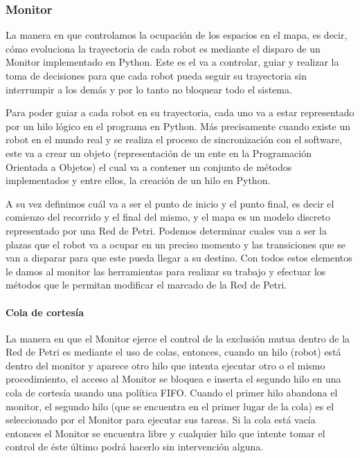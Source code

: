 \subsubsection{Monitor} \mbox{} \vspace{1pt}

La manera en que controlamos la ocupación de los espacios en el mapa, es decir, cómo evoluciona la trayectoria de cada robot es mediante el disparo de un Monitor implementado en Python. Este es el va a controlar, guiar y realizar la toma de decisiones para que cada robot pueda seguir su trayectoria sin interrumpir a los demás y por lo tanto no bloquear todo el sistema.

Para poder guiar a cada robot en su trayectoria, cada uno va a estar representado por un hilo lógico en el programa en Python. Más precisamente cuando existe un robot en el mundo real y se realiza el proceso de sincronización con el software, este va a crear un objeto (representación de un ente en la Programación Orientada a Objetos) el cual va a contener un conjunto de métodos implementados y entre ellos, la creación de un hilo en Python.

A su vez definimos cuál va a ser el punto de inicio y el punto final, es decir el comienzo del recorrido y el final del mismo, y el mapa es un modelo discreto representado por una Red de Petri. Podemos determinar cuales van a ser la plazas que el robot va a ocupar en un preciso momento y las transiciones que se van a disparar para que este pueda llegar a su destino. Con todos estos elementos le damos al monitor las herramientas para realizar su trabajo y efectuar los métodos que le permitan modificar el marcado de la Red de Petri.

\paragraph{Cola de cortesía} \mbox{} \vspace{5pt}

La manera en que el Monitor ejerce el control de la exclusión mutua dentro de la Red de Petri es mediante el uso de colas, entonces, cuando un hilo (robot) está dentro del monitor y aparece otro hilo que intenta ejecutar otro o el mismo procedimiento, el acceso al Monitor se bloquea e inserta el segundo hilo en una cola de cortesía usando una política FIFO. Cuando el primer hilo abandona el monitor, el segundo hilo (que se encuentra en el primer lugar de la cola) es el seleccionado por el Monitor para ejecutar sus tareas. Si la cola está vacía entonces el Monitor se encuentra libre y cualquier hilo que intente tomar el control de éste último podrá hacerlo sin intervención alguna.

